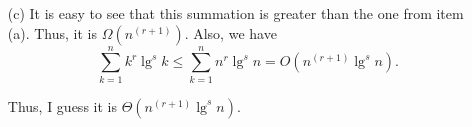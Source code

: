 \begin{enumerate}
\begin{framed}
\begin{enumerate}
\item[(c)] It is easy to see that this summation is greater than the one from
item (a). Thus, it is $\Omega(n^{(r + 1)})$. Also, we have
\[
  \sum_{k = 1}^{n} k^r \lg^{s} k \le \sum_{k = 1}^{n} n^r \lg^{s} n = O(n^{(r + 1)} \lg^s n).
\]

Thus, I guess it is $\Theta(n^{(r + 1)} \lg^s n)$.

\end{enumerate}
\end{framed}

\end{enumerate}
